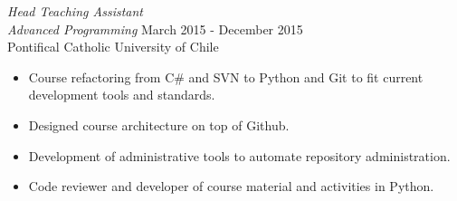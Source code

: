 \documentclass[margin, 10pt]{res} %
\begin{document}
\begin{resume}
{\sl Head Teaching Assistant \\Advanced Programming} \hfill March 2015 - December 2015 \\
Pontifical Catholic University of Chile
\begin{itemize}  \itemsep -2pt
\item Course refactoring from C\# and SVN to Python and Git to fit current development tools and standards.
\item Designed course architecture on top of Github.
\item Development of administrative tools to automate repository administration.
\item Code reviewer and developer of course material and activities in Python.
\end{itemize}

\end{resume}
\end{document}
